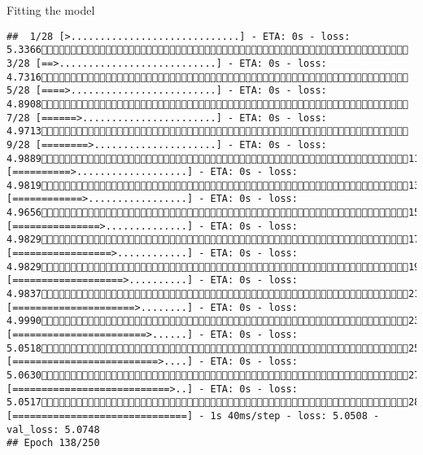 \documentclass[
  ignorenonframetext,
]{beamer}
\begin{document}
\begin{frame}[fragile]{Fitting the model}
\begin{verbatim}
##  1/28 [>.............................] - ETA: 0s - loss: 5.3366 3/28 [==>...........................] - ETA: 0s - loss: 4.7316 5/28 [====>.........................] - ETA: 0s - loss: 4.8908 7/28 [======>.......................] - ETA: 0s - loss: 4.9713 9/28 [========>.....................] - ETA: 0s - loss: 4.988911/28 [==========>...................] - ETA: 0s - loss: 4.981913/28 [============>.................] - ETA: 0s - loss: 4.965615/28 [===============>..............] - ETA: 0s - loss: 4.982917/28 [=================>............] - ETA: 0s - loss: 4.982919/28 [===================>..........] - ETA: 0s - loss: 4.983721/28 [=====================>........] - ETA: 0s - loss: 4.999023/28 [=======================>......] - ETA: 0s - loss: 5.051825/28 [=========================>....] - ETA: 0s - loss: 5.063027/28 [===========================>..] - ETA: 0s - loss: 5.051728/28 [==============================] - 1s 40ms/step - loss: 5.0508 - val_loss: 5.0748
## Epoch 138/250

\end{verbatim}
\end{frame}
\end{document}
